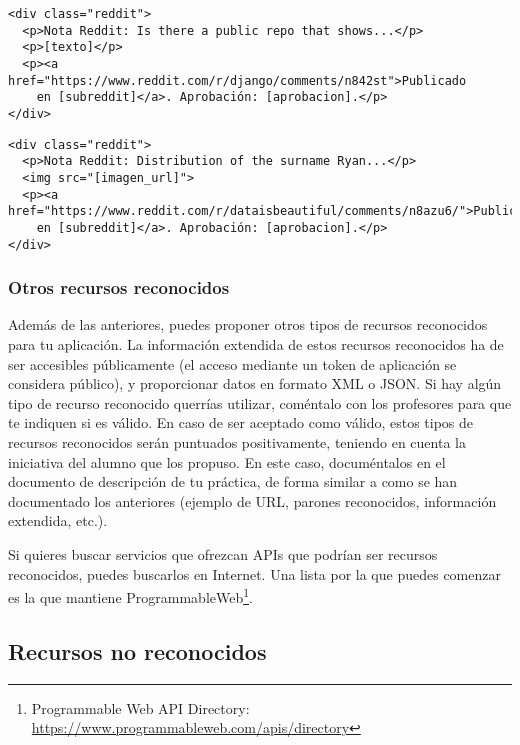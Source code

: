 \begin{itemize}
\begin{itemize}
{\footnotesize
\begin{verbatim}
<div class="reddit">
  <p>Nota Reddit: Is there a public repo that shows...</p>
  <p>[texto]</p>
  <p><a href="https://www.reddit.com/r/django/comments/n842st">Publicado
    en [subreddit]</a>. Aprobación: [aprobacion].</p>
</div>
\end{verbatim}
}

{\footnotesize
\begin{verbatim}
<div class="reddit">
  <p>Nota Reddit: Distribution of the surname Ryan...</p>
  <img src="[imagen_url]">
  <p><a href="https://www.reddit.com/r/dataisbeautiful/comments/n8azu6/">Publicado
    en [subreddit]</a>. Aprobación: [aprobacion].</p>
</div>
\end{verbatim}
}

    \end{itemize}
  \end{itemize}

\subsubsection{Otros recursos reconocidos}


Además de las anteriores, puedes proponer otros tipos de recursos reconocidos para tu aplicación. La información extendida de estos recursos reconocidos ha de ser accesibles públicamente (el acceso mediante un token de aplicación se considera público), y proporcionar datos en formato XML o JSON. Si hay algún tipo de recurso reconocido querrías utilizar, coméntalo con los profesores para que te indiquen si es válido. En caso de ser aceptado como válido, estos tipos de recursos reconocidos serán puntuados positivamente, teniendo en cuenta la iniciativa del alumno que los propuso. En este caso, documéntalos en el documento de descripción de tu práctica, de forma similar a como se han documentado los anteriores (ejemplo de URL, parones reconocidos, información extendida, etc.). 

Si quieres buscar servicios que ofrezcan APIs que podrían ser recursos reconocidos, puedes buscarlos en Internet. Una lista por la que puedes comenzar es la que mantiene ProgrammableWeb\footnote{Programmable Web API Directory: \\\url{https://www.programmableweb.com/apis/directory}}.

\subsection{Recursos no reconocidos}
\label{sec:practica-final-2021-05:noreconocidos}

